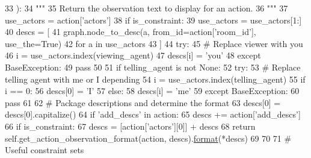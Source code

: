 \begin{DoxyCode}
33 ):
34     \textcolor{stringliteral}{"""}
35 \textcolor{stringliteral}{    Return the observation text to display for an action.}
36 \textcolor{stringliteral}{    """}
37     use\_actors = action[\textcolor{stringliteral}{'actors'}]
38     \textcolor{keywordflow}{if} is\_constraint:
39         use\_actors = use\_actors[1:]
40     descs = [
41         graph.node\_to\_desc(a, from\_id=action[\textcolor{stringliteral}{'room\_id'}], use\_the=\textcolor{keyword}{True})
42         \textcolor{keywordflow}{for} a \textcolor{keywordflow}{in} use\_actors
43     ]
44     \textcolor{keywordflow}{try}:
45         \textcolor{comment}{# Replace viewer with you}
46         i = use\_actors.index(viewing\_agent)
47         descs[i] = \textcolor{stringliteral}{'you'}
48     \textcolor{keywordflow}{except} BaseException:
49         \textcolor{keywordflow}{pass}
50 
51     \textcolor{keywordflow}{if} telling\_agent \textcolor{keywordflow}{is} \textcolor{keywordflow}{not} \textcolor{keywordtype}{None}:
52         \textcolor{keywordflow}{try}:
53             \textcolor{comment}{# Replace telling agent with me or I depending}
54             i = use\_actors.index(telling\_agent)
55             \textcolor{keywordflow}{if} i == 0:
56                 descs[0] = \textcolor{stringliteral}{'I'}
57             \textcolor{keywordflow}{else}:
58                 descs[i] = \textcolor{stringliteral}{'me'}
59         \textcolor{keywordflow}{except} BaseException:
60             \textcolor{keywordflow}{pass}
61 
62     \textcolor{comment}{# Package descriptions and determine the format}
63     descs[0] = descs[0].capitalize()
64     \textcolor{keywordflow}{if} \textcolor{stringliteral}{'add\_descs'} \textcolor{keywordflow}{in} action:
65         descs += action[\textcolor{stringliteral}{'add\_descs'}]
66     \textcolor{keywordflow}{if} is\_constraint:
67         descs = [action[\textcolor{stringliteral}{'actors'}][0]] + descs
68     \textcolor{keywordflow}{return} self.get\_action\_observation\_format(action, descs).\hyperlink{namespaceparlai_1_1chat__service_1_1services_1_1messenger_1_1shared__utils_a32e2e2022b824fbaf80c747160b52a76}{format}(*descs)
69 
70 
71 \textcolor{comment}{# Useful constraint sets}
\end{DoxyCode}
\mbox{\label{namespacelight__chats_1_1graph_a76960b89046df1b0cda1de931fa1fd69}} 
